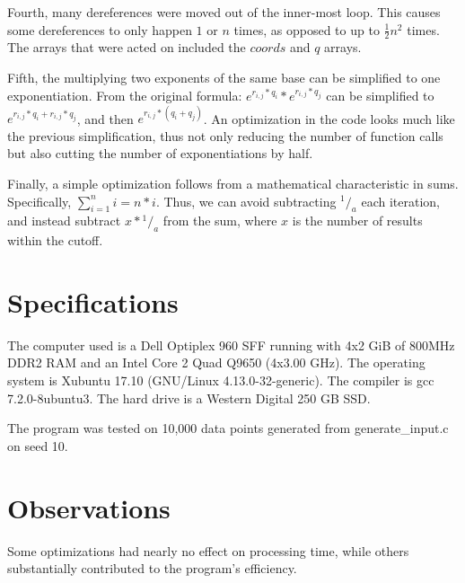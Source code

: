 \documentclass[12pt]{article}
\begin{document}
	Fourth, many dereferences were moved out of the inner-most loop.
	This causes some dereferences to only happen $1$ or $n$ times, as opposed to up to $\frac{1}{2}n^2$ times.
	The arrays that were acted on included the $coords$ and $q$ arrays.

	Fifth, the multiplying two exponents of the same base can be simplified to one exponentiation.
	From the original formula: $e^{r_{i,j}*q_i}*e^{r_{i,j}*q_j}$ can be simplified to $e^{r_{i,j}*q_i+r_{i,j}*q_j}$, and then $e^{r_{i,j}*(q_i+q_j)}$.
	An optimization in the code looks much like the previous simplification, 
	thus not only reducing the number of function calls but also cutting the number of exponentiations by half.

	Finally, a simple optimization follows from a mathematical characteristic in sums. 
	Specifically, $\displaystyle\sum_{i=1}^n{i} = n*i$.
	Thus, we can avoid subtracting $^1/_a$ each iteration, and instead subtract $x*{^1/_a}$ from the sum,
	where $x$ is the number of results within the cutoff.

	\section{Specifications}

	The computer used is a Dell Optiplex 960 SFF running with 4x2 GiB of 800MHz DDR2 RAM and an Intel Core 2 Quad Q9650 (4x3.00 GHz).
	The operating system is Xubuntu 17.10 (GNU/Linux 4.13.0-32-generic).
	The compiler is gcc 7.2.0-8ubuntu3.
	The hard drive is a Western Digital 250 GB SSD.

	The program was tested on 10,000 data points generated from generate\_input.c on seed 10.

	\section{Observations}

	Some optimizations had nearly no effect on processing time, while others substantially contributed to the program's efficiency.
\end{document}
